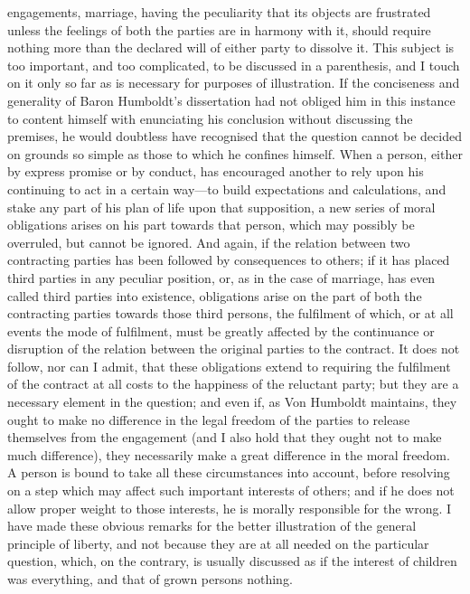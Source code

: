 \documentclass[12pt]{article}
\begin{document}
engagements, marriage, having the peculiarity that its objects are frustrated unless the feelings of both the parties are in harmony with it, should require nothing more than the declared will of either party to dissolve it. This subject is too important, and too complicated, to be discussed in a parenthesis, and I touch on it only so far as is necessary for purposes of illustration. If the conciseness and generality of Baron Humboldt's dissertation had not obliged him in this instance to content himself with enunciating his conclusion without discussing the premises, he would doubtless have recognised that the question cannot be decided on grounds so simple as those to which he confines himself. When a person, either by express promise or by conduct, has encouraged another to rely upon his continuing to act in a certain way---to build expectations and calculations, and stake any part of his plan of life upon that supposition, a new series of moral obligations arises on his part towards that person, which may possibly be overruled, but cannot be ignored. And again, if the relation between two contracting parties has been followed by consequences to others; if it has placed third parties in any peculiar position, or, as in the case of marriage, has even called third parties into existence, obligations arise on the part of both the contracting parties towards those third persons, the fulfilment of which, or at all events the mode of fulfilment, must be greatly affected by the continuance or disruption of the relation between the original parties to the contract. It does not follow, nor can I admit, that these obligations extend to requiring the fulfilment of the contract at all costs to the happiness of the reluctant party; but they are a necessary element in the question; and even if, as Von Humboldt maintains, they ought to make no difference in the legal freedom of the parties to release themselves from the engagement (and I also hold that they ought not to make much difference), they necessarily make a great difference in the moral freedom. A person is bound to take all these circumstances into account, before resolving on a step which may affect such important interests of others; and if he does not allow proper weight to those interests, he is morally responsible for the wrong. I have made these obvious remarks for the better illustration of the general principle of liberty, and not because they are at all needed on the particular question, which, on the contrary, is usually discussed as if the interest of children was everything, and that of grown persons nothing.
\end{document}
